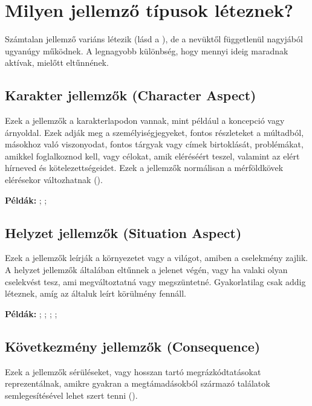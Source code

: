 \section{Milyen jellemző típusok léteznek?}

Számtalan jellemző variáns létezik (lásd a ), de a nevüktől függetlenül nagyjából ugyanúgy működnek. A legnagyobb különbség, hogy mennyi ideig maradnak aktívak, mielőtt eltűnnének.

\subsection[Karakter jellemzők]{Karakter jellemzők (Character Aspect)}

Ezek a jellemzők a karakterlapodon vannak, mint például a koncepció vagy árnyoldal. Ezek adják meg a személyiségjegyeket, fontos részleteket a múltadból, másokhoz való viszonyodat, fontos tárgyak vagy címek birtoklását, problémákat, amikkel foglalkoznod kell, vagy célokat, amik eléréséért teszel, valamint az elért hírneved és kötelezettségeidet. Ezek a jellemzők normálisan a mérföldkövek elérésekor változhatnak ().

\textbf{Példák:} ; ; 

\subsection[Helyzet jellemzők]{Helyzet jellemzők (Situation Aspect)}

Ezek a jellemzők leírják a környezetet vagy a világot, amiben a cselekmény zajlik. A helyzet jellemzők általában eltűnnek a jelenet végén, vagy ha valaki olyan cselekvést tesz, ami megváltoztatná vagy megszüntetné. Gyakorlatilag csak addig léteznek, amíg az általuk leírt körülmény fennáll.

\textbf{Példák:} ; ; ; ; 

\subsection[Következmény jellemzők]{Következmény jellemzők (Consequence)}

Ezek a jellemzők sérüléseket, vagy hosszan tartó megrázkódtatásokat reprezentálnak, amikre gyakran a megtámadásokból származó találatok semlegesítésével lehet szert tenni ().

